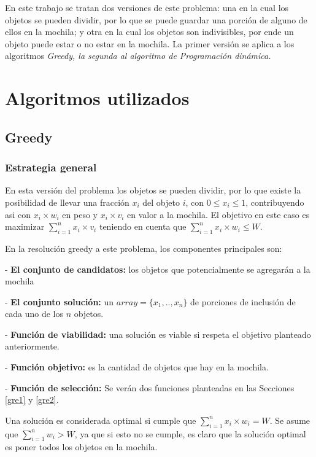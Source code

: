 \documentclass[a4paper,10pt,spanish]{article}
\begin{document}
En este trabajo se tratan dos versiones de este problema: una en la cual los objetos se pueden dividir, por lo que se puede guardar una porci\'on de alguno de ellos en la mochila; y otra en la cual los objetos son indivisibles, por ende un objeto puede estar o no estar en la mochila. La primer versi\'on se aplica a los algoritmos \em Greedy\em, la segunda al algoritmo de \em Programaci\'on din\'amica\em.

\newpage

\section{Algoritmos utilizados}
	\subsection{Greedy}
	\subsubsection{Estrategia general}
	En esta versi\'on del problema los objetos se pueden dividir, por lo que existe la posibilidad de llevar una fracci\'on $x_i$ del objeto $i$, con $0\leq x_i\leq 1$, contribuyendo asi con $x_i\times w_i$ en peso y $x_i\times v_i$ en valor a la mochila.
	El objetivo en este caso es maximizar $\sum_{i=1}^n x_i\times v_i$ teniendo en cuenta que $\sum_{i=1}^n x_i\times w_i \leq W$.
	
	En la resoluci\'on greedy a este problema, los componentes principales son:
	\begin{list}{}{}
	 \item[-] {\bf El conjunto de candidatos:} los objetos que potencialmente se agregar\'an a la mochila
	 \item[-] {\bf El conjunto soluci\'on:} un $array=\{{x_1, .., x_n}\}$ de porciones de inclusi\'on de cada uno de los $n$ objetos.
	 \item[-] {\bf Funci\'on de viabilidad:} una soluci\'on es viable si respeta el objetivo planteado anteriormente.
	 \item[-] {\bf Funci\'on objetivo:} es la cantidad de objetos que hay en la mochila.
	 \item[-] {\bf Funci\'on de selecci\'on:} Se ver\'an dos funciones planteadas en las Secciones \ref{gre1} y \ref{gre2}.
	\end{list}
	
	Una soluci\'on es considerada optimal si cumple que $\sum_{i=1}^n x_i\times w_i = W$. Se asume que $\sum_{i=1}^n w_i > W$, ya que si esto no se cumple, es claro que la soluci\'on optimal es poner todos los objetos en la mochila.
	
\end{document}
